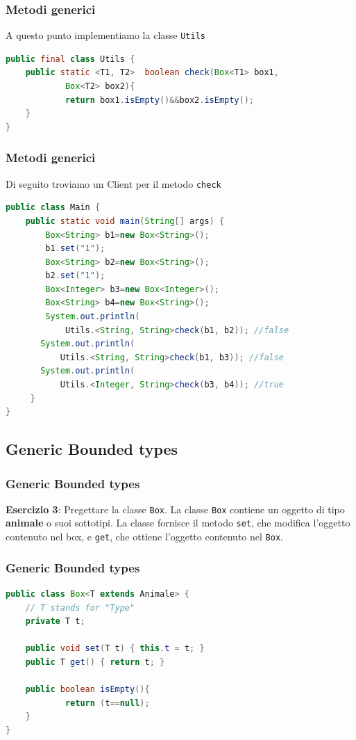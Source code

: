 \documentclass{beamer}
\begin{document}
\begin{frame}[fragile]
\frametitle{Metodi generici}
A questo punto implementiamo la classe \texttt{Utils}
\begin{framed}
\begin{lstlisting}[language=Java]
public final class Utils {
    public static <T1, T2>  boolean check(Box<T1> box1, 
	        Box<T2> box2){
	        return box1.isEmpty()&&box2.isEmpty();
	}
}
\end{lstlisting}
\end{framed}
\end{frame}

\begin{frame}[fragile]
\frametitle{Metodi generici}
Di seguito troviamo un Client per il metodo \texttt{check}
\begin{framed}
\begin{lstlisting}[language=Java]
public class Main {
    public static void main(String[] args) {
        Box<String> b1=new Box<String>();
        b1.set("1");
        Box<String> b2=new Box<String>();
        b2.set("1");
        Box<Integer> b3=new Box<Integer>();
        Box<String> b4=new Box<String>();
        System.out.println(
            Utils.<String, String>check(b1, b2)); //false
       System.out.println(
           Utils.<String, String>check(b1, b3)); //false
       System.out.println(
           Utils.<Integer, String>check(b3, b4)); //true
     }
}
\end{lstlisting}
\end{framed}
\end{frame}


\subsection{Generic Bounded types}

\begin{frame}
\frametitle{Generic Bounded types}
\begin{framed}
\textbf{Esercizio 3}: Pregettare la classe \texttt{Box}. La classe \texttt{Box} contiene un oggetto di tipo \textbf{animale} o suoi sottotipi. La classe fornisce il metodo \texttt{set}, che modifica l'oggetto contenuto nel box, e  \texttt{get}, che ottiene l'oggetto contenuto nel \texttt{Box}.
\end{framed}
\end{frame}

\begin{frame}[fragile]
\frametitle{Generic Bounded types}
\begin{framed}
\begin{lstlisting}[language=Java]
public class Box<T extends Animale> {
    // T stands for "Type"
    private T t;

    public void set(T t) { this.t = t; }
    public T get() { return t; }
    
    public boolean isEmpty(){
    		return (t==null);
    }
}
\end{lstlisting}
\end{framed}
\end{frame}
\end{document}
